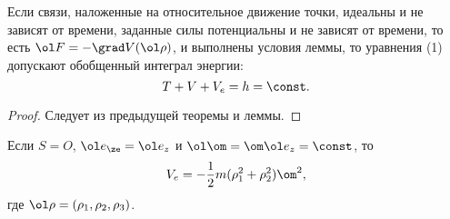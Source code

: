 \documentclass[a4paper,12pt]{article}
\def\F{\ol F}
\def\w{\ol\om}
\def\p{\ol\rho}
\def\e{\ol e}
\begin{document}
\begin{theorem}
Если связи, наложенные на относительное движение
точки, идеальны и не зависят от времени, заданные силы потенциальны
и не зависят от времени, то есть $\F=-\grad V(\p)$, и выполнены
условия леммы, то уравнения (1) допускают обобщенный интеграл энергии:
$$T+V+V_e=h=\const.$$
\end{theorem}

\begin{proof}
Следует из предыдущей теоремы и леммы.
\end{proof}

\begin{imp}
Если $S = O$, $\e_\ze=\e_z$ и
$\w=\om\e_z =\const$, то
$$V_e=-\frac12m(\rho_1^2+\rho_2^2)\om^2,$$
где $\p = (\rho_1,\rho_2,\rho_3)$.
\end{imp}
\end{document}
